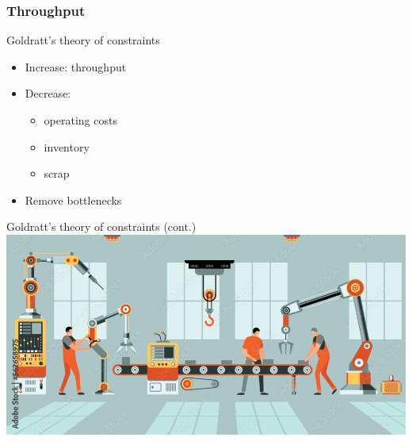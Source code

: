 \documentclass{beamer}
\begin{document}
	\subsubsection{Throughput}
	\begin{frame}{Goldratt's theory of constraints}
		\begin{itemize}
			\item Increase: throughput \pause
			\item Decrease: \pause
			\begin{itemize}
				\item operating costs \pause
				\item inventory \pause
				\item scrap \pause
			\end{itemize}
			\item Remove bottlenecks
		\end{itemize}
	\end{frame}
	\begin{frame}{Goldratt's theory of constraints (cont.)}
		\includegraphics{assemblyline}
	\end{frame}
\end{document}
